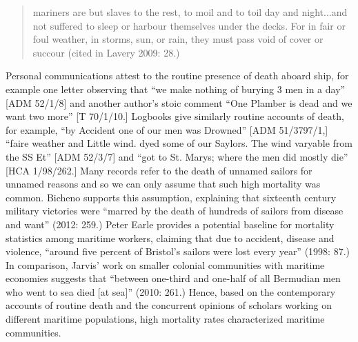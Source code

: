 \begin{quotation}
mariners are but slaves to the rest, to moil and to toil day and night...and not suffered to sleep or harbour themselves under the decks. For in fair or foul weather, in storms, sun, or rain, they must pass void of cover or succour (cited in Lavery 2009: 28.) 

\end{quotation}
\begin{styleStandard}
Personal communications attest to the routine presence of death aboard ship, for example one letter observing that “we make nothing of burying 3 men in a day” [ADM 52/1/8] and another author’s stoic comment “One Plamber is dead and we want two more” [T 70/1/10.] Logbooks give similarly routine accounts of death, for example, “by Accident one of our men was Drowned” [ADM 51/3797/1,] “faire weather and Little wind. dyed some of our Saylors. The wind varyable from the SS Et” [ADM 52/3/7] and “got to St. Marys; where the men did mostly die” [HCA 1/98/262.] Many records refer to the death of unnamed sailors for unnamed reasons and so we can only assume that such high mortality was common. Bicheno supports this assumption, explaining that sixteenth century military victories were “marred by the death of hundreds of sailors from disease and want” (2012: 259.) Peter Earle provides a potential baseline for mortality statistics among maritime workers, claiming that due to accident, disease and violence, “around five percent of Bristol’s sailors were lost every year” (1998: 87.) In comparison, Jarvis’ work on smaller colonial communities with maritime economies suggests that “between one-third and one-half of all Bermudian men who went to sea died [at sea]” (2010: 261.) Hence, based on the contemporary accounts of routine death and the concurrent opinions of scholars working on different maritime populations, high mortality rates characterized maritime communities. 
\end{styleStandard}


